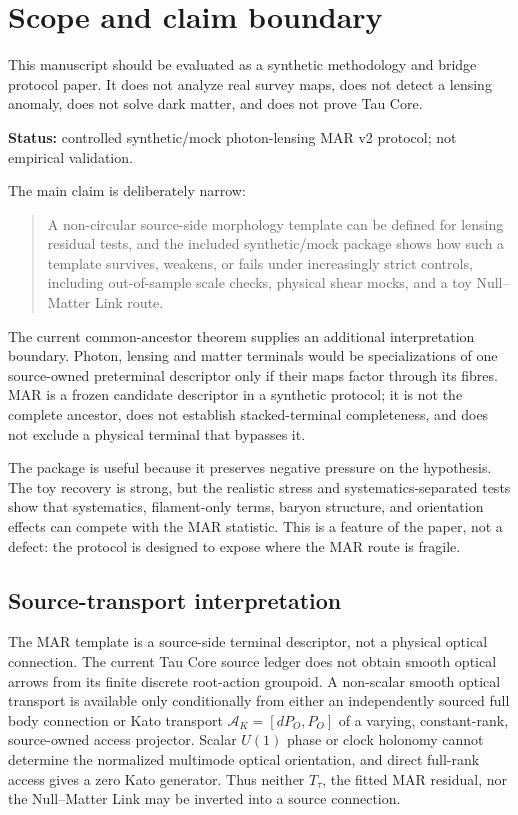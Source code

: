 \documentclass[12pt]{article}
\begin{document}
\tableofcontents

\section{Scope and claim boundary}

This manuscript should be evaluated as a synthetic methodology and bridge
protocol paper.  It does not analyze real survey maps, does not detect a
lensing anomaly, does not solve dark matter, and does not prove Tau Core.

\noindent\textbf{Status:} controlled synthetic/mock photon-lensing MAR v2
protocol; not empirical validation.

The main claim is deliberately narrow:
\begin{quote}
A non-circular source-side morphology template can be defined for lensing
residual tests, and the included synthetic/mock package shows how such a
template survives, weakens, or fails under increasingly strict controls,
including out-of-sample scale checks, physical shear mocks, and a toy
Null--Matter Link route.
\end{quote}

The current common-ancestor theorem supplies an additional interpretation
boundary.  Photon, lensing and matter terminals would be specializations of
one source-owned preterminal descriptor only if their maps factor through its
fibres.  MAR is a frozen candidate descriptor in a synthetic protocol; it is
not the complete ancestor, does not establish stacked-terminal completeness,
and does not exclude a physical terminal that bypasses it.

The package is useful because it preserves negative pressure on the hypothesis.
The toy recovery is strong, but the realistic stress and systematics-separated
tests show that systematics, filament-only terms, baryon structure, and
orientation effects can compete with the MAR statistic.  This is a feature of
the paper, not a defect: the protocol is designed to expose where the MAR route
is fragile.

\subsection{Source-transport interpretation}

The MAR template is a source-side terminal descriptor, not a physical optical
connection. The current Tau Core source ledger does not obtain smooth optical
arrows from its finite discrete root-action groupoid. A non-scalar smooth
optical transport is available only conditionally from either an independently
sourced full body connection or Kato transport
\(\mathcal A_K=[dP_O,P_O]\) of a varying, constant-rank, source-owned access
projector. Scalar \(U(1)\) phase or clock holonomy cannot determine the
normalized multimode optical orientation, and direct full-rank access gives a
zero Kato generator. Thus neither \(T_\tau\), the fitted MAR residual, nor the
Null--Matter Link may be inverted into a source connection.
\end{document}
